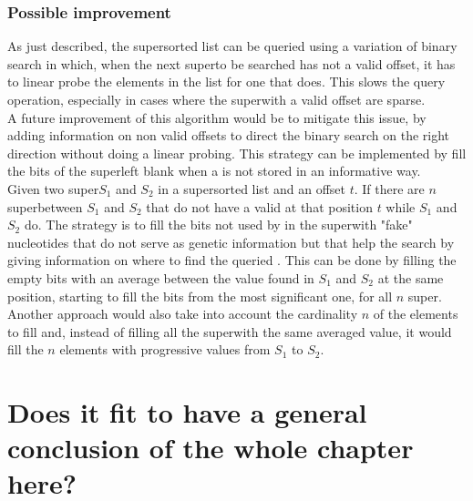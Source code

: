 \subsubsection{Possible improvement}
As just described, the super\kmer sorted list can be queried using a variation of binary search in which, when the next super\kmer to be searched has not a valid offset, it has to linear probe the elements in the list for one that does. This slows the query operation, especially in cases where the super\kmers with a valid offset are sparse. \\
A future improvement of this algorithm would be to mitigate this issue, by adding information on non valid offsets to direct the binary search on the right direction without doing a linear probing. This strategy can be implemented by fill the bits of the super\kmer left blank when a \kmer is not stored in an informative way.\\
Given two super\kmers $S_1$ and $S_2$ in a super\kmer sorted list and an offset $t$. If there are $n$ super\kmers between $S_1$ and $S_2$ that do not have a valid \kmer at that position $t$ while $S_1$ and $S_2$ do. The strategy is to fill the bits not used by \kmers in the super\kmer with "fake" nucleotides that do not serve as genetic information but that help the search by giving information on where to find the queried \kmer. This can be done by filling the empty bits with an average between the value found in $S_1$ and $S_2$ at the same position, starting to fill the bits from the most significant one, for all $n$ super\kmers. Another approach would also take into account the cardinality $n$ of the elements to fill and, instead of filling all the super\kmers with the same averaged value, it would fill the $n$ elements with progressive values from $S_1$ to $S_2$.

\section{Does it fit to have a general conclusion of the whole chapter here?}

